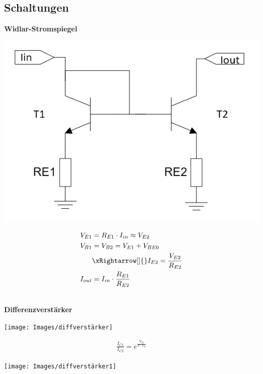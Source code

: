 \subsection{Schaltungen}
\textbf{Widlar-Stromspiegel}\\
\begin{minipage}{0.20\textwidth}
	\includegraphics[width=\linewidth,keepaspectratio=true]{Images/widlar-stromspiegel}
\end{minipage}%
\begin{minipage}{0.30\textwidth}
	\begin{align*}
		V_{E1} &= R_{E1}\cdot I_{in} \approx V_{E2} \\
		V_{B1} &= V_{B2} = V_{E1}+V_{BE0} \\
		&\xRightarrow[]{} I_{E2} = \frac{V_{E2}}{R_{E2}} \\
		I_{out} &= I_{in} \cdot \frac{R_{E1}}{R_{E2}}
	\end{align*}
\end{minipage}\\
\textbf{Differenzverstärker}\\
\begin{minipage}{0.20\textwidth}
	\texttt{[image: Images/diffverstärker]}
\end{minipage}%
\begin{minipage}{0.30\textwidth}
	\begin{align*}
		\frac{I_{C1}}{I_{C2}} = e^{\frac{V_D}{n\cdot V_T}}
	\end{align*}
\end{minipage}
\begin{minipage}{0.20\textwidth}
	\texttt{[image: Images/diffverstärker1]}
\end{minipage}%
